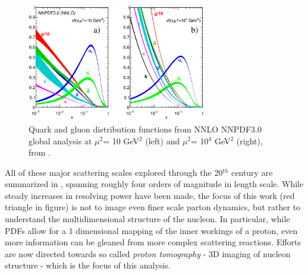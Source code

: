                 \begin{figure}[H]
            \centering
            \includegraphics[width=0.7\textwidth]{Chapters/Ch1-Intro/Ch1-Sec1-Background/pics/inelastic-ep/partonPDFs.png}
            \caption[Parton Distribution Functions]{Quark and gluon distribution functions from NNLO NNPDF3.0 global analysis at $\mu^2$= 10 GeV$^2$ (left) and $\mu^2$= 10$^4$ GeV$^2$ (right),  from \parencite{Zyla2020ReviewPhysics}.}
            \label{fig:PDFPlots}
        \end{figure}

       All of these major scattering scales explored through the 20$^{th}$ century are summarized in , spanning roughly four orders of magnitude in length scale. While steady increases in resolving power have been made, the focus of this work (red triangle in figure) is not to image even finer scale parton dynamics, but rather to understand the multidimensional structure of the nucleon. In particular, while PDFs allow for a 1 dimensional mapping of the inner workings of a proton, even more information can be gleaned from more complex scattering reactions. Efforts are now directed towards so called \textit{proton tomography} - 3D imaging of nucleon structure - which is the focus of this analysis. 

